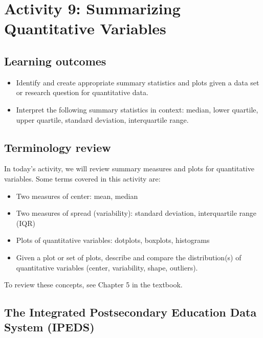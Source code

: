 \documentclass[
]{report}
\begin{document}
\newpage

\section{Activity 9: Summarizing Quantitative Variables}\label{activity-9-summarizing-quantitative-variables}


\subsection{Learning outcomes}\label{learning-outcomes-9}

\begin{itemize}
\item
  Identify and create appropriate summary statistics and plots given a data set or research question for quantitative data.
\item
  Interpret the following summary statistics in context:
  median, lower quartile, upper quartile,
  standard deviation, interquartile range.
\end{itemize}

\subsection{Terminology review}\label{terminology-review-7}

In today's activity, we will review summary measures and plots for quantitative variables. Some terms covered in this activity are:

\begin{itemize}
\item
  Two measures of center: mean, median
\item
  Two measures of spread (variability): standard deviation, interquartile range (IQR)
\item
  Plots of quantitative variables: dotplots, boxplots, histograms
\item
  Given a plot or set of plots, describe and compare the distribution(s)
  of quantitative variables
  (center, variability, shape, outliers).
\end{itemize}

To review these concepts, see Chapter 5 in the textbook.

\subsection{The Integrated Postsecondary Education Data System (IPEDS)}\label{the-integrated-postsecondary-education-data-system-ipeds}
\end{document}
